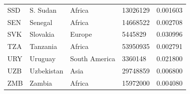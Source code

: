 \documentclass[11pt]{report}
\begin{document}
\begin{table}[]
\begin{tabular}{lllll}
            SSD                           & S. Sudan                  & Africa                         & 13026129                      & 0.001603                           \\
            SEN                           & Senegal                   & Africa                         & 14668522                      & 0.002708                           \\
            SVK                           & Slovakia                  & Europe                         & 5445829                       & 0.030996                           \\
            TZA                           & Tanzania                  & Africa                         & 53950935                      & 0.002791                           \\
            URY                           & Uruguay                   & South America                  & 3360148                       & 0.021800                           \\
            UZB                           & Uzbekistan                & Asia                           & 29748859                      & 0.006800                           \\
            ZMB                           & Zambia                    & Africa                         & 15972000                      & 0.004080
        \end{tabular}
    \end{table}
\end{document}
